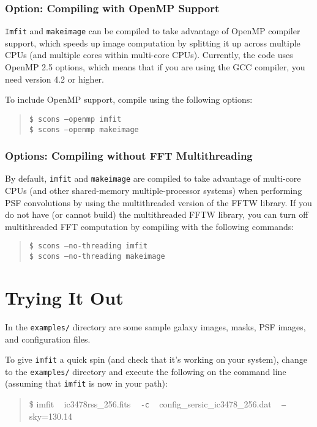 \documentclass[10pt]{article}
\newcommand{\imfit}{\texttt{imfit}}
\newcommand{\Imfit}{\texttt{Imfit}}
\newcommand{\makeimage}{\texttt{makeimage}}
\begin{document}
\subsubsection{Option: Compiling with OpenMP Support}

\Imfit{} and \makeimage{} can be compiled to take advantage of OpenMP compiler support,
which speeds up image computation by splitting it up across multiple CPUs
(and multiple cores within multi-core CPUs).
Currently, the code uses OpenMP 2.5 options, which means that if you are using
the GCC compiler, you need version 4.2 or higher.

To include OpenMP support, compile using the following options:
\begin{quote}
\texttt{\$ scons --openmp imfit} \\
\texttt{\$ scons --openmp makeimage}
\end{quote}

\subsubsection{Options: Compiling without FFT Multithreading}

By default, \imfit{} and \makeimage{} are compiled to take advantage of multi-core CPUs (and other
shared-memory multiple-processor systems) when performing PSF convolutions by using the 
multithreaded version of the
FFTW library. If you do not have (or cannot build) the multithreaded FFTW library,
you can turn off multithreaded FFT computation by compiling with the following commands:
\begin{quote}
\texttt{\$ scons --no-threading imfit} \\
\texttt{\$ scons --no-threading makeimage}
\end{quote}






\section{Trying It Out}

In the \texttt{examples/} directory are some sample galaxy images, masks, PSF images, and
configuration files.

To give \imfit{} a quick spin (and check that it's working on your system), change to the
\texttt{examples/} directory and execute the following on the command line (assuming that
\imfit{} is now in your path):
\begin{quote}
\$ imfit ~ ic3478rss\_256.fits ~ \texttt{-c} ~ config\_sersic\_ic3478\_256.dat ~ \texttt{--}sky=130.14
\end{quote}
\end{document}
